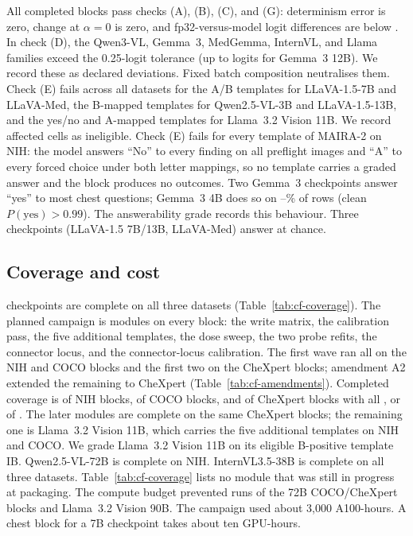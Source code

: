 All \cfWriteBlocks{} completed blocks pass checks (A), (B), (C), and (G): determinism error is zero, change at $\alpha=0$ is zero, and fp32-versus-model logit differences are below \cfGateFpMax{}. In check (D), the Qwen3-VL, Gemma~3, MedGemma, InternVL, and Llama families exceed the 0.25-logit tolerance (up to \cfGateBatchMax{} logits for Gemma~3 12B). We record these as declared deviations. Fixed batch composition neutralises them. Check (E) fails across all datasets for the A/B templates for LLaVA-1.5-7B and LLaVA-Med, the B-mapped templates for Qwen2.5-VL-3B and LLaVA-1.5-13B, and the yes/no and A-mapped templates for Llama~3.2 Vision 11B. We record affected cells as ineligible. Check (E) fails for every template of MAIRA-2 \citep{bannur2024maira} on NIH: the model answers ``No'' to every finding on all \cfSpecUngradedRows{} preflight images and ``A'' to every forced choice under both letter mappings, so no template carries a graded answer and the block produces no outcomes. Two Gemma~3 checkpoints answer ``yes'' to most chest questions; Gemma~3 4B does so on \cfGemmaFourYesMin--\cfGemmaFourYesMax\% of rows (clean $P(\mathrm{yes})>0.99$). The answerability grade records this behaviour. Three checkpoints (LLaVA-1.5 7B/13B, LLaVA-Med) answer at chance.

\subsection{Coverage and cost}
\label{app:cf-coverage}

\cfCheckpointsCompleteWord{} checkpoints are complete on all three datasets (Table~\ref{tab:cf-coverage}). The planned campaign is \cfCoveragePlannedWord{} modules on every block: the write matrix, the calibration pass, the five additional templates, the dose sweep, the two probe refits, the connector locus, and the connector-locus calibration. The first wave ran all \cfCoveragePlannedWord{} on the NIH and COCO blocks and the first two on the CheXpert blocks; amendment A2 extended the remaining \cfCoverageChexAddedWord{} to CheXpert (Table~\ref{tab:cf-amendments}). Completed coverage is \cfCoverageNihAllSeven{} of \cfCoverageNihBlocks{} NIH blocks, \cfCoverageCocoAllSeven{} of \cfCoverageCocoBlocks{} COCO blocks, and \cfCoverageChexAllSeven{} of \cfCoverageChexBlocks{} CheXpert blocks with all \cfCoveragePlannedWord{}, or \cfCoverageBlocksAllSeven{} of \cfBlocks{}. The \cfCoverageChexAddedWord{} later modules are complete on the same \cfCoverageChexFull{} CheXpert blocks; the remaining one is Llama~3.2 Vision 11B, which carries the five additional templates on NIH and COCO. We grade Llama~3.2 Vision 11B on its eligible B-positive template IB. Qwen2.5-VL-72B is complete on NIH. InternVL3.5-38B is complete on all three datasets. Table~\ref{tab:cf-coverage} lists no module that was still in progress at packaging. The compute budget prevented runs of the 72B COCO/CheXpert blocks and Llama~3.2 Vision 90B. The campaign used about 3,000 A100-hours. A chest block for a 7B checkpoint takes about ten GPU-hours.

